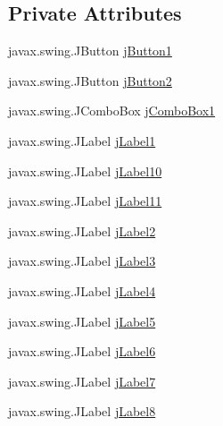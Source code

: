\subsection*{Private Attributes}
\begin{DoxyCompactItemize}
\item 
javax.\+swing.\+J\+Button \mbox{\hyperlink{class_interfaz_package_1_1_alta_libro_lectura_abd046e1ca910f6419304b648e1e0ecaa}{j\+Button1}}
\item 
javax.\+swing.\+J\+Button \mbox{\hyperlink{class_interfaz_package_1_1_alta_libro_lectura_a10ae90b6c76399e4509186a1b9d80f42}{j\+Button2}}
\item 
javax.\+swing.\+J\+Combo\+Box \mbox{\hyperlink{class_interfaz_package_1_1_alta_libro_lectura_ac1e5e88822746a9f922ab99cab5fd21b}{j\+Combo\+Box1}}
\item 
javax.\+swing.\+J\+Label \mbox{\hyperlink{class_interfaz_package_1_1_alta_libro_lectura_a356654b6ac16de88f1537402ce6b6258}{j\+Label1}}
\item 
javax.\+swing.\+J\+Label \mbox{\hyperlink{class_interfaz_package_1_1_alta_libro_lectura_a1ba04a625fc1945d471079471ff341bf}{j\+Label10}}
\item 
javax.\+swing.\+J\+Label \mbox{\hyperlink{class_interfaz_package_1_1_alta_libro_lectura_ada3bdfc583114e6ba88ce12cb9ba9a3f}{j\+Label11}}
\item 
javax.\+swing.\+J\+Label \mbox{\hyperlink{class_interfaz_package_1_1_alta_libro_lectura_adbfcbf3815dc0b6a49f8f73bfb381191}{j\+Label2}}
\item 
javax.\+swing.\+J\+Label \mbox{\hyperlink{class_interfaz_package_1_1_alta_libro_lectura_a8e3068311cd0998f45b8d16b5df07315}{j\+Label3}}
\item 
javax.\+swing.\+J\+Label \mbox{\hyperlink{class_interfaz_package_1_1_alta_libro_lectura_a0f93dcf00bc93a61d9fc78c0143d9bdf}{j\+Label4}}
\item 
javax.\+swing.\+J\+Label \mbox{\hyperlink{class_interfaz_package_1_1_alta_libro_lectura_a022dc8ebc55257499f93b99bddf47167}{j\+Label5}}
\item 
javax.\+swing.\+J\+Label \mbox{\hyperlink{class_interfaz_package_1_1_alta_libro_lectura_adad4d61512f9ca3dc3fb3276975ac720}{j\+Label6}}
\item 
javax.\+swing.\+J\+Label \mbox{\hyperlink{class_interfaz_package_1_1_alta_libro_lectura_a35314814f07024c5ef5f0afa592a502f}{j\+Label7}}
\item 
javax.\+swing.\+J\+Label \mbox{\hyperlink{class_interfaz_package_1_1_alta_libro_lectura_a04a4898900537bec80bdc4e81d5c41cf}{j\+Label8}}

\end{DoxyCompactItemize}
